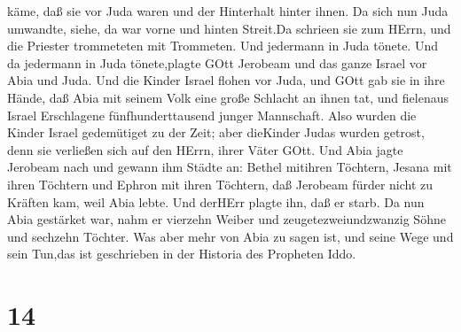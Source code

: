 käme, daß sie vor Juda waren und der Hinterhalt hinter ihnen.
 Da sich nun Juda umwandte, siehe, da war vorne und hinten
Streit.Da schrieen sie zum HErrn, und die Priester trommeteten mit
Trommeten.  Und jedermann in Juda tönete. Und da jedermann
in Juda tönete,plagte GOtt Jerobeam und das ganze Israel vor Abia und
Juda.  Und die Kinder Israel flohen vor Juda, und GOtt gab
sie in ihre Hände,  daß Abia mit seinem Volk eine große
Schlacht an ihnen tat, und fielenaus Israel Erschlagene
fünfhunderttausend junger Mannschaft.  Also wurden die
Kinder Israel gedemütiget zu der Zeit; aber dieKinder Judas wurden
getrost, denn sie verließen sich auf den HErrn, ihrer Väter GOtt.
 Und Abia jagte Jerobeam nach und gewann ihm Städte an:
Bethel mitihren Töchtern, Jesana mit ihren Töchtern und Ephron mit ihren
Töchtern,  daß Jerobeam fürder nicht zu Kräften kam, weil
Abia lebte. Und derHErr plagte ihn, daß er starb.  Da nun
Abia gestärket war, nahm er vierzehn Weiber und zeugetezweiundzwanzig
Söhne und sechzehn Töchter.  Was aber mehr von Abia zu
sagen ist, und seine Wege und sein Tun,das ist geschrieben in der
Historia des Propheten Iddo.

\hypertarget{section-13}{%
\section{14}\label{section-13}}

